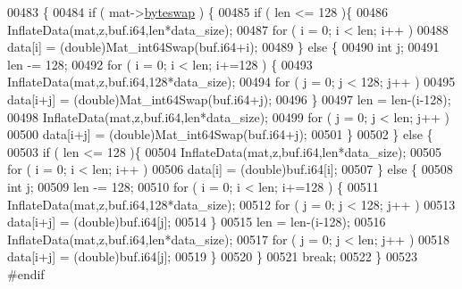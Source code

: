 \begin{DoxyCode}
00483         \{
00484             \textcolor{keywordflow}{if} ( mat->\hyperlink{struct__mat__t_a99d207977af5e04941ace56d71817a40}{byteswap} ) \{
00485                 \textcolor{keywordflow}{if} ( len <= 128 )\{
00486                     InflateData(mat,z,buf.i64,len*data\_size);
00487                     \textcolor{keywordflow}{for} ( i = 0; i < len; i++ )
00488                         data[i] = (\textcolor{keywordtype}{double})Mat\_int64Swap(buf.i64+i);
00489                 \} \textcolor{keywordflow}{else} \{
00490                     \textcolor{keywordtype}{int} j;
00491                     len -= 128;
00492                     \textcolor{keywordflow}{for} ( i = 0; i < len; i+=128 ) \{
00493                         InflateData(mat,z,buf.i64,128*data\_size);
00494                         \textcolor{keywordflow}{for} ( j = 0; j < 128; j++ )
00495                             data[i+j] = (\textcolor{keywordtype}{double})Mat\_int64Swap(buf.i64+j);
00496                     \}
00497                     len = len-(i-128);
00498                     InflateData(mat,z,buf.i64,len*data\_size);
00499                     \textcolor{keywordflow}{for} ( j = 0; j < len; j++ )
00500                         data[i+j] = (\textcolor{keywordtype}{double})Mat\_int64Swap(buf.i64+j);
00501                 \}
00502             \} \textcolor{keywordflow}{else} \{
00503                 \textcolor{keywordflow}{if} ( len <= 128 )\{
00504                     InflateData(mat,z,buf.i64,len*data\_size);
00505                     \textcolor{keywordflow}{for} ( i = 0; i < len; i++ )
00506                         data[i] = (\textcolor{keywordtype}{double})buf.i64[i];
00507                 \} \textcolor{keywordflow}{else} \{
00508                     \textcolor{keywordtype}{int} j;
00509                     len -= 128;
00510                     \textcolor{keywordflow}{for} ( i = 0; i < len; i+=128 ) \{
00511                         InflateData(mat,z,buf.i64,128*data\_size);
00512                         \textcolor{keywordflow}{for} ( j = 0; j < 128; j++ )
00513                             data[i+j] = (\textcolor{keywordtype}{double})buf.i64[j];
00514                     \}
00515                     len = len-(i-128);
00516                     InflateData(mat,z,buf.i64,len*data\_size);
00517                     \textcolor{keywordflow}{for} ( j = 0; j < len; j++ )
00518                         data[i+j] = (\textcolor{keywordtype}{double})buf.i64[j];
00519                 \}
00520             \}
00521             \textcolor{keywordflow}{break};
00522         \}
00523 \textcolor{preprocessor}{#endif}

\end{DoxyCode}
